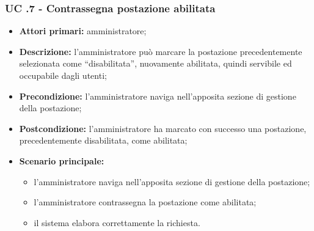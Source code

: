 
\subsubsection{UC .7 - Contrassegna postazione abilitata}

\begin{itemize}
\item \textbf{Attori primari:} amministratore;
\item \textbf{Descrizione:} l’amministratore può marcare la postazione precedentemente selezionata come “disabilitata”, nuovamente abilitata, quindi servibile ed occupabile dagli utenti;
\item \textbf{Precondizione:} l’amministratore naviga nell’apposita sezione di gestione della postazione; 
\item \textbf{Postcondizione:} l’amministratore ha marcato con successo una postazione, precedentemente disabilitata, come abilitata;
\item \textbf{Scenario principale:} 
	\begin{itemize}
		\item l’amministratore naviga nell’apposita sezione di gestione della postazione;
		\item l’amministratore contrassegna la postazione come abilitata;
		\item il sistema elabora correttamente la richiesta.
	\end{itemize}
\end{itemize}
